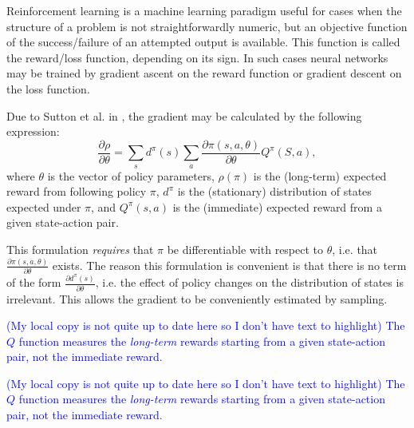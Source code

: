 \documentclass[12pt,twoside]{reedthesis}
\newcommand{\comment}[2]{\textbf{#1} \textcolor{blue}{#2}}
\begin{document}

Reinforcement learning is a machine learning paradigm useful for cases when the structure of a problem is not straightforwardly numeric, but an objective function of the success/failure of an attempted output is available. This function is called the reward/loss function, depending on its sign. In such cases neural networks may be trained by gradient ascent on the reward function or gradient descent on the loss function.


Due to Sutton et al. in \cite{sutton1999policygradient}, the gradient may be calculated by the following expression:
\[
    \frac{\partial \rho}{\partial \theta} = \sum_s d^\pi(s) \sum_a \frac{\partial \pi(s,a, \theta)}{\partial \theta}Q^\pi(S,a),
\]
where $\theta$ is the vector of policy parameters, $\rho(\pi)$ is the (long-term) expected reward from following policy $\pi$, $d^\pi$ is the (stationary) distribution of states expected under $\pi$, and $Q^\pi(s,a)$ is the (immediate) expected reward from a given state-action pair.

This formulation \textit{requires} that $\pi$ be differentiable with respect to $\theta$, i.e. that $\frac{\partial \pi(s,a, \theta)}{\partial \theta}$ exists.
The reason this formulation is convenient is that there is no term of the form $\frac{\partial d^\pi(s)}{\partial \theta}$, i.e. the effect of policy changes on the distribution of states is irrelevant.
This allows the gradient to be conveniently estimated by sampling.  %

\comment{}{(My local copy is not quite up to date here so I don't have text to highlight) The $Q$ function measures the \emph{long-term} rewards starting from a given state-action pair, not the immediate reward.}

\comment{}{(My local copy is not quite up to date here so I don't have text to highlight) The $Q$ function measures the \emph{long-term} rewards starting from a given state-action pair, not the immediate reward.}
\end{document}
